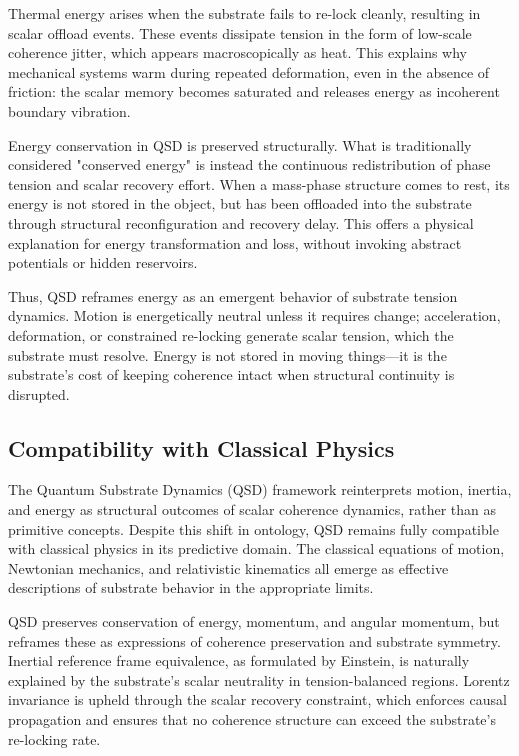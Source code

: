 \documentclass[entropy,article,submit,pdftex,moreauthors]{Definitions/mdpi}
\begin{document}
Thermal energy arises when the substrate fails to re-lock cleanly, resulting in scalar offload events. These events dissipate tension in the form of low-scale coherence jitter, which appears macroscopically as heat. This explains why mechanical systems warm during repeated deformation, even in the absence of friction: the scalar memory becomes saturated and releases energy as incoherent boundary vibration.

Energy conservation in QSD is preserved structurally. What is traditionally considered "conserved energy" is instead the continuous redistribution of phase tension and scalar recovery effort. When a mass-phase structure comes to rest, its energy is not stored in the object, but has been offloaded into the substrate through structural reconfiguration and recovery delay. This offers a physical explanation for energy transformation and loss, without invoking abstract potentials or hidden reservoirs.

Thus, QSD reframes energy as an emergent behavior of substrate tension dynamics. Motion is energetically neutral unless it requires change; acceleration, deformation, or constrained re-locking generate scalar tension, which the substrate must resolve. Energy is not stored in moving things---it is the substrate’s cost of keeping coherence intact when structural continuity is disrupted.

\subsection{Compatibility with Classical Physics}

The Quantum Substrate Dynamics (QSD) framework reinterprets motion, inertia, and energy as structural outcomes of scalar coherence dynamics, rather than as primitive concepts. Despite this shift in ontology, QSD remains fully compatible with classical physics in its predictive domain. The classical equations of motion, Newtonian mechanics, and relativistic kinematics all emerge as effective descriptions of substrate behavior in the appropriate limits.

QSD preserves conservation of energy, momentum, and angular momentum, but reframes these as expressions of coherence preservation and substrate symmetry. Inertial reference frame equivalence, as formulated by Einstein, is naturally explained by the substrate’s scalar neutrality in tension-balanced regions. Lorentz invariance is upheld through the scalar recovery constraint, which enforces causal propagation and ensures that no coherence structure can exceed the substrate’s re-locking rate.
\end{document}
